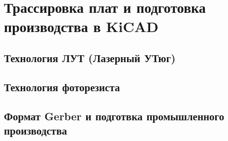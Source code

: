 \chapter{Трассировка плат и подготовка производства в KiCAD}

\section{Технология ЛУТ (Лазерный УТюг)}

\section{Технология фоторезиста}

\section{Формат Gerber и подготвка промышленного производства}
